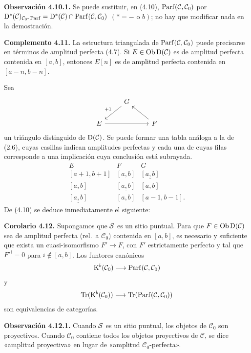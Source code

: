 \textbf{Observación 4.10.1.} Se puede sustituir, en (4.10), \(\Parf(\mathcal C,\mathcal C_0)\) por \(\Dpx^*(\mathcal C)_{\mathcal C_0\text{-}\Parf}=\Dpx^*(\mathcal C)\cap\Parf(\mathcal C,\mathcal C_0)\) \((*=-\text{ o }b)\); no hay que modificar nada en la demostración.

\textbf{Complemento 4.11.} La estructura triangulada de \(\Parf(\mathcal C,\mathcal C_0)\) puede precisarse en términos de amplitud perfecta (4.7). Si \(E\in\Ob\Dpx(\mathcal C)\) es de amplitud perfecta contenida en \([a,b]\), entonces \(E[n]\) es de amplitud perfecta contenida en \([a-n,b-n]\).

Sea
\[
\begin{tikzcd}
& G \arrow[dl,"+1"'] & \\
E \arrow[rr] && F \arrow[ul]
\end{tikzcd}
\]
un triángulo distinguido de \(\Dpx(\mathcal C)\). Se puede formar una tabla análoga a la de (2.6), cuyas casillas indican amplitudes perfectas y cada una de cuyas filas corresponde a una implicación cuya conclusión está subrayada.
\[
\begin{array}{ccc}
E&F&G\\[0.3em]
{}[a+1,b+1]&{}[a,b]&\underline{[a,b]}\\
{}[a,b]&\underline{[a,b]}&{}[a,b]\\
\underline{[a,b]}&{}[a,b]&{}[a-1,b-1].
\end{array}
\]
De (4.10) se deduce inmediatamente el siguiente:

\textbf{Corolario 4.12.} Supongamos que \(\sisi{S}{\mathcal S}\) es un sitio puntual. Para que \(F\in\Ob\Dpx(\mathcal C)\) sea de amplitud perfecta (rel.\ a \(\mathcal C_0\)) contenida en \([a,b]\), es necesario y suficiente que exista un cuasi-isomorfismo \(F'\to F\), con \(F'\) estrictamente perfecto y tal que \(F'^i=0\) para \(i\notin[a,b]\). Los funtores canónicos
\[
  \Kpx^b(\mathcal C_0)\longrightarrow\Parf(\mathcal C,\mathcal C_0)
\]
y
\[
  \Tr(\Kpx^b(\mathcal C_0))\longrightarrow\Tr(\Parf(\mathcal C,\mathcal C_0))
\]
son equivalencias de categorías.

\textbf{Observación 4.12.1.} Cuando \(\sisi{S}{\mathcal S}\) es un sitio puntual, los objetos de \(\mathcal C_0\) son proyectivos. Cuando \(\mathcal C_0\) contiene todos los objetos proyectivos de \(\mathcal C\), se dice «amplitud proyectiva» en lugar de «amplitud \(\mathcal C_0\)-perfecta».
